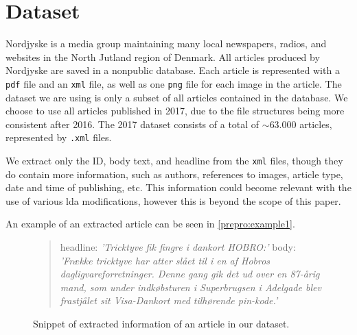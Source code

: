 \section{Dataset}\label{sec:dataset}
Nordjyske is a media group maintaining many local newspapers, radios, and websites in the North Jutland region of Denmark.
All articles produced by Nordjyske are saved in a nonpublic database.
Each article is represented with a \texttt{pdf} file and an \texttt{xml} file, as well as one \texttt{png} file for each image in the article.
The dataset we are using is only a subset of all articles contained in the database.
We choose to use all articles published in 2017, due to the file structures being more consistent after 2016.
The 2017 dataset consists of a total of $\sim 63.000$ articles, represented by \texttt{.xml} files.

We extract only the ID, body text, and headline from the \texttt{xml} files, though they do contain more information, such as authors, references to images, article type, date and time of publishing, etc.
This information could become relevant with the use of various \gls{lda} modifications, however this is beyond the scope of this paper.

An example of an extracted article can be seen in \autoref{prepro:example1}.

\begin{figure}[h]
	\begin{framed}
		\begin{quote}
			headline: \textit{'Tricktyve fik fingre i dankort HOBRO:'}
			body: \textit{'Frække tricktyve har atter slået til i en af Hobros dagligvareforretninger. Denne gang gik det ud over en 87-årig mand, som under indkøbsturen i Superbrugsen i Adelgade blev frastjålet sit Visa-Dankort med tilhørende pin-kode.'}
		\end{quote}
	\end{framed}
		\caption{Snippet of extracted information of an article in our dataset.}
		\label{prepro:example1}
\end{figure}

